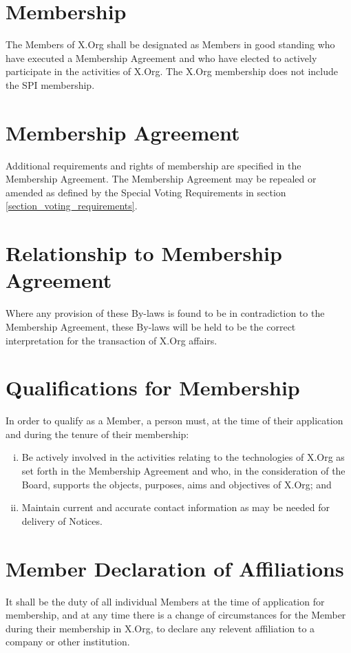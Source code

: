 \documentclass[10pt, english]{xorgdocs}
\begin{document}

\section{Membership}
The Members of X.Org shall be designated as Members in good standing who have
executed a Membership Agreement and who have elected to actively participate in
the activities of X.Org. The X.Org membership does not include the SPI
membership.

\section{Membership Agreement}
Additional requirements and rights of membership are specified in the Membership
Agreement. The Membership Agreement may be repealed or amended as defined by
the Special Voting Requirements in section \ref{section_voting_requirements}.

\section{Relationship to Membership Agreement}
Where any provision of these By-laws is found to be in contradiction to the
Membership Agreement, these By-laws will be held to be the correct
interpretation for the transaction of X.Org affairs.

\section{Qualifications for Membership}
In order to qualify as a Member, a person must, at the time of their application
and during the tenure of their membership:

\begin{enumerate}[(i)\hspace{.2cm}]
	\item Be actively involved in the activities relating to the technologies
	of X.Org as set forth in the Membership Agreement and who, in the
	consideration of the Board, supports the objects, purposes, aims
	and objectives of X.Org; and

	\item Maintain current and accurate contact information as may be needed
	for delivery of Notices.
\end{enumerate}

\section{Member Declaration of Affiliations}
It shall be the duty of all individual Members at the time of application for
membership, and at any time there is a change of circumstances for the Member
during their membership in X.Org, to declare any relevent affiliation to a
company or other institution.
\end{document}
